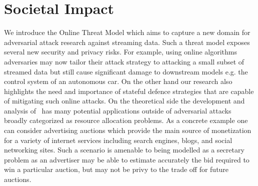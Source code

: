 \section*{Societal Impact}
\label{broader_impact}
We introduce the Online Threat Model which aims to capture a new domain for adversarial attack research against streaming data. Such a threat model exposes several new security and privacy risks. For example, using online algorithms adversaries may now tailor their attack strategy to attacking a small subset of streamed data but still cause significant damage to downstream models e.g. the control system of an autonomous car. On the other hand our research also highlights the need and importance of stateful defence strategies that are capable of mitigating such online attacks. On the theoretical side the development and analysis of \algoname \ has many potential applications outside of adversarial attacks broadly categorized as resource allocation problems. As a concrete example one can consider advertising auctions which provide the main source of monetization for a variety of internet services including search engines, blogs, and social networking sites. Such a scenario is amenable to being modelled as a secretary problem as an advertiser may be able to estimate accurately the bid required to win a particular auction, but may not be privy to the trade off for future auctions.

